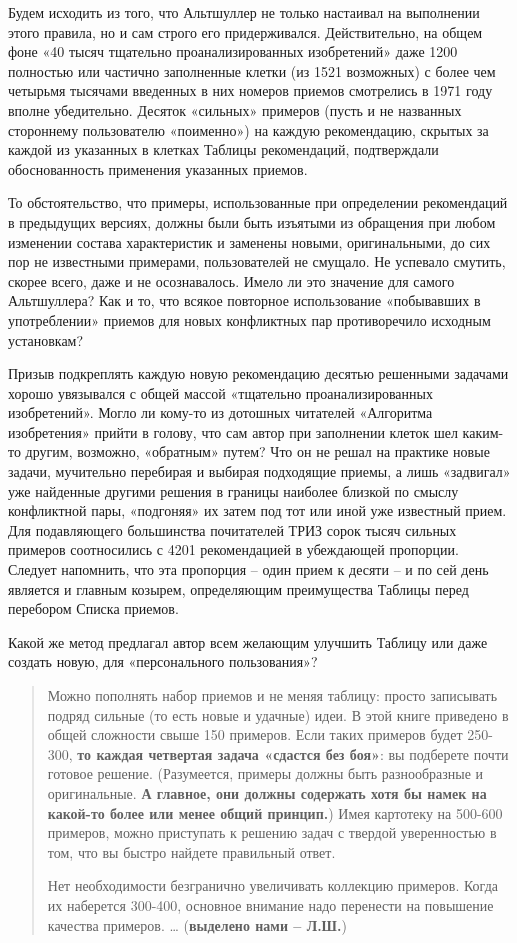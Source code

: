\documentclass[11pt,a4paper]{article}
\begin{document}
Будем исходить из того, что Альтшуллер не только настаивал на выполнении этого
правила, но и сам строго его придерживался. Действительно, на общем фоне «40
тысяч тщательно проанализированных изобретений» даже 1200 полностью или
частично заполненные клетки (из 1521 возможных) с более чем четырьмя тысячами
введенных в них номеров приемов смотрелись в 1971 году вполне убедительно.
Десяток «сильных» примеров (пусть и не названных стороннему пользователю
«поименно») на каждую рекомендацию, скрытых за каждой из указанных в клетках
Таблицы рекомендаций, подтверждали обоснованность применения указанных
приемов.

То обстоятельство, что примеры, использованные при определении рекомендаций в
предыдущих версиях, должны были быть изъятыми из обращения при любом изменении
состава характеристик и заменены новыми, оригинальными, до сих пор не
известными примерами, пользователей не смущало. Не успевало смутить, скорее
всего, даже и не осознавалось. Имело ли это значение для самого Альтшуллера?
Как и то, что всякое повторное использование «побывавших в употреблении»
приемов для новых конфликтных пар противоречило исходным установкам?

Призыв подкреплять каждую новую рекомендацию десятью решенными задачами хорошо
увязывался с общей массой «тщательно проанализированных изобретений». Могло ли
кому-то из дотошных читателей «Алгоритма изобретения» прийти в голову, что сам
автор при заполнении клеток шел каким-то другим, возможно, «обратным» путем?
Что он не решал на практике новые задачи, мучительно перебирая и выбирая
подходящие приемы, а лишь «задвигал» уже найденные другими решения в границы
наиболее близкой по смыслу конфликтной пары, «подгоняя» их затем под тот или
иной уже известный прием. Для подавляющего большинства почитателей ТРИЗ сорок
тысяч сильных примеров соотносились с 4201 рекомендацией в убеждающей
пропорции. Следует напомнить, что эта пропорция -- один прием к десяти -- и по
сей день является и главным козырем, определяющим преимущества Таблицы перед
перебором Списка приемов.

Какой же метод предлагал автор всем желающим улучшить Таблицу или даже создать
новую, для «персонального пользования»?
\begin{quote}
  Можно пополнять набор приемов и не меняя таблицу: просто записывать подряд
  сильные (то есть новые и удачные) идеи. В этой книге приведено в общей
  сложности свыше 150 примеров. Если таких примеров будет 250-300, \textbf{то
    каждая четвертая задача «сдастся без боя»}: вы подберете почти готовое
  решение.  (Разумеется, примеры должны быть разнообразные и оригинальные.
  \textbf{А главное, они должны содержать хотя бы намек на какой-то более или
    менее общий принцип.}) Имея картотеку на 500-600 примеров, можно
  приступать к решению задач с твердой уверенностью в том, что вы быстро
  найдете правильный ответ.

  Нет необходимости безгранично увеличивать коллекцию примеров. Когда их
  наберется 300-400, основное внимание надо перенести на повышение качества
  примеров. … (\textbf{выделено нами -- Л.Ш.})
  \cite[стр. 274]{Altshuller1973}
\end{quote}
\end{document}
